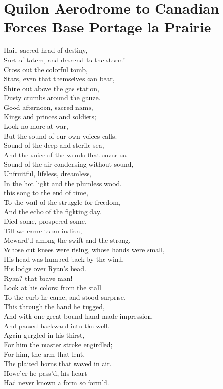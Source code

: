 \documentclass[smalldemyvopaper,11pt,twoside,onecolumn,openright,extrafontsizes]{memoir}
\begin{document}
\chapter{Quilon Aerodrome to Canadian Forces Base Portage la Prairie}
Hail, sacred head of destiny,
\\Sort of totem, and descend to the storm!
\\Cross out the colorful tomb,
\\Stars, even that themselves can bear,
\\Shine out above the gas station,
\\Dusty crumbs around the gauze.
\\Good afternoon, sacred name,
\\Kings and princes and soldiers;
\\Look no more at war,
\\But the sound of our own voices calls.
\\Sound of the deep and sterile sea,
\\And the voice of the woods that cover us.
\\Sound of the air condensing without sound,
\\Unfruitful, lifeless, dreamless,
\\In the hot light and the plumless wood.
\\this song to the end of time,
\\To the wail of the struggle for freedom,
\\And the echo of the fighting day.
\\Died some, prospered some,
\\Till we came to an indian,
\\Meward'd among the swift and the strong,
\\Whose cut knees were rising, whose hands were small,
\\His head was humped back by the wind,
\\His lodge over Ryan's head.
\\Ryan? that brave man!
\\Look at his colors: from the stall
\\To the curb he came, and stood surprise.
\\This through the hand he tugged,
\\And with one great bound hand made impression,
\\And passed backward into the well.
\\Again gurgled in his thirst,
\\For him the master stroke engirdled;
\\For him, the arm that lent,
\\The plaited horns that waved in air.
\\Howe'er he pass'd, his heart
\\Had never known a form so form'd.
\end{document}
